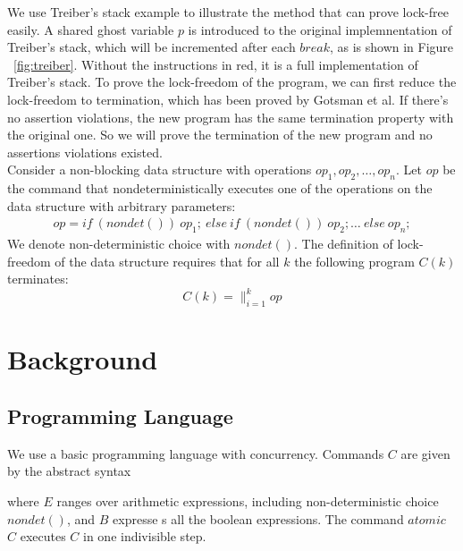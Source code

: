 \documentclass{article}
\begin{document}
We use Treiber's stack example to illustrate the method that can prove lock-free easily. A shared ghost variable $p$ is introduced to the original implemnentation of Treiber's stack, which will be incremented after each $break$, as is shown in Figure ~\ref{fig:treiber}. Without the instructions in red, it is a full implementation of Treiber's stack. To prove the lock-freedom of the program, we can first reduce the lock-freedom to termination, which has been proved by Gotsman et al\cite{gotsman2009proving}. If there's no assertion violations, the new program has the same termination property with the original one. So we will prove the termination of the new program and no assertions violations existed.\\

Consider a non-blocking data structure with operations $op_1, op_2, \dots , op_n$. Let $op$ be the command that nondeterministically executes one of the operations on the data structure with arbitrary parameters:
\begin{align}
op = if \ (nondet()) \ op_1;\ else \ if \ (nondet())\ op_2; \dots\ else \ op_n;
\end{align}
We denote non-deterministic choice with $nondet()$. The definition of lock-freedom of the data structure requires that for all $k$ the following program $C(k)$ terminates:
\begin{equation}
C(k) = \parallel_{i = 1}^k op
\end{equation} 

\section{Background}
\label{sec:back}
\subsection{Programming Language}
\label{sec:language}
We use a basic programming language with concurrency. Commands $C$ are given by the abstract syntax \\

\ottgrammartabular{\ottcmd}

where $E$ ranges over arithmetic expressions, including non-deterministic choice $nondet()$, and $B$ expresse	s all the boolean expressions. The command $atomic$ $C$ executes $C$ in one indivisible step.
\end{document}
